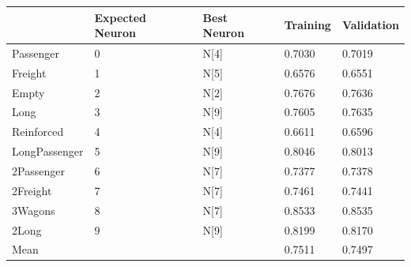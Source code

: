 \begin{tabular}{lllll}
\toprule
 & Expected Neuron & Best Neuron & Training & Validation \\
\midrule
Passenger & 0 & N[4] & 0.7030 & 0.7019 \\
Freight & 1 & N[5] & 0.6576 & 0.6551 \\
Empty & 2 & N[2] & 0.7676 & 0.7636 \\
Long & 3 & N[9] & 0.7605 & 0.7635 \\
Reinforced & 4 & N[4] & 0.6611 & 0.6596 \\
LongPassenger & 5 & N[9] & 0.8046 & 0.8013 \\
2Passenger & 6 & N[7] & 0.7377 & 0.7378 \\
2Freight & 7 & N[7] & 0.7461 & 0.7441 \\
3Wagons & 8 & N[7] & 0.8533 & 0.8535 \\
2Long & 9 & N[9] & 0.8199 & 0.8170 \\
Mean &  &  & 0.7511 & 0.7497 \\
\bottomrule
\end{tabular}
